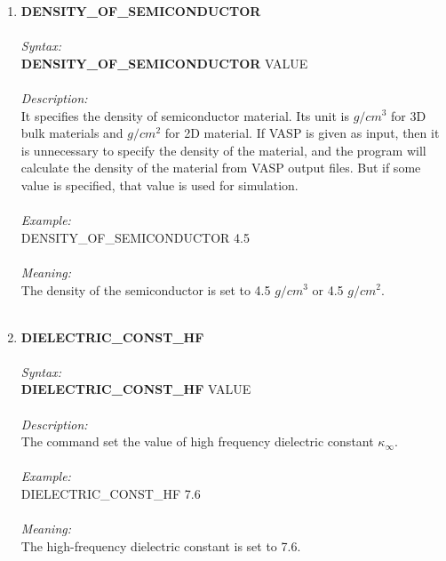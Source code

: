 \documentclass[12pt]{article}
\begin{document}
\begin{enumerate}
    \item \textbf{DENSITY\_OF\_SEMICONDUCTOR} \\ \\
    \textit{Syntax:} \\
    \textbf{DENSITY\_OF\_SEMICONDUCTOR} VALUE \\ \\
    \textit{Description:} \\
    It specifies the density of semiconductor material. Its unit is $g/cm^3$ for 3D bulk materials and $g/cm^2$ for 2D material. If VASP is given as input, then it is unnecessary to specify the density of the material, and the program will calculate the density of the material from VASP output files. But if some value is specified, that value is used for simulation. \\ \\
    \textit{Example:} \\
    DENSITY\_OF\_SEMICONDUCTOR 4.5 \\ \\
    \textit{Meaning:} \\ 
    The density of the semiconductor is set to 4.5 $g/cm^3$ or 4.5 $g/cm^2$. \\ \\

    \item \textbf{DIELECTRIC\_CONST\_HF} \\ \\
    \textit{Syntax:} \\
    \textbf{DIELECTRIC\_CONST\_HF} VALUE \\ \\
    \textit{Description:} \\
    The command set the value of high frequency dielectric constant $\kappa_\infty$. \\ \\
    \textit{Example:} \\
    DIELECTRIC\_CONST\_HF 7.6 \\ \\
    \textit{Meaning:} \\    
    The high-frequency dielectric constant is set to 7.6. \\ \\


\end{enumerate}
\end{document}
